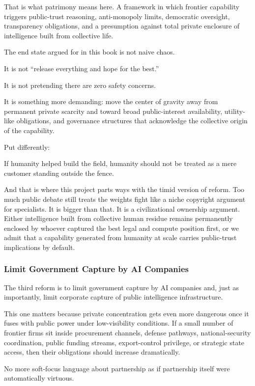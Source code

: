 \documentclass[
  american,
  12pt,
  letterpaper,
]{article}
\begin{document}
That is what patrimony means here. A framework in which frontier
capability triggers public-trust reasoning, anti-monopoly limits,
democratic oversight, transparency obligations, and a presumption
against total private enclosure of intelligence built from collective
life.

The end state argued for in this book is not naive chaos.

It is not ``release everything and hope for the best.''

It is not pretending there are zero safety concerns.

It is something more demanding: move the center of gravity away from
permanent private scarcity and toward broad public-interest
availability, utility-like obligations, and governance structures that
acknowledge the collective origin of the capability.

Put differently:

If humanity helped build the field, humanity should not be treated as a
mere customer standing outside the fence.

And that is where this project parts ways with the timid version of
reform. Too much public debate still treats the weights fight like a
niche copyright argument for specialists. It is bigger than that. It is
a civilizational ownership argument. Either intelligence built from
collective human residue remains permanently enclosed by whoever
captured the best legal and compute position first, or we admit that a
capability generated from humanity at scale carries public-trust
implications by default.

\subsubsection{Limit Government Capture by AI
Companies}\label{limit-government-capture-by-ai-companies}

The third reform is to limit government capture by AI companies and,
just as importantly, limit corporate capture of public intelligence
infrastructure.

This one matters because private concentration gets even more dangerous
once it fuses with public power under low-visibility conditions. If a
small number of frontier firms sit inside procurement channels, defense
pathways, national-security coordination, public funding streams,
export-control privilege, or strategic state access, then their
obligations should increase dramatically.

No more soft-focus language about partnership as if partnership itself
were automatically virtuous.
\end{document}
